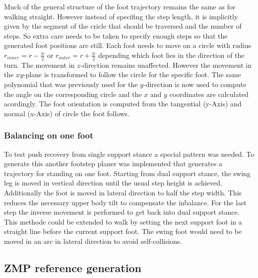 \documentclass[english,ngerman]{KITreprt}
\newcommand{\clr}[2]{{\color{#1}{#2}}}
\newcommand{\todo}[1]{\marginpar{\clr{red}{#1}}}
\begin{document}
Much of the general structure of the foot trajectory remains the same as
for walking straight. However instead of specifing the step length, it
is implicitly given by the segment of the cricle that should be
traversed and the number of steps. So extra care needs to be taken to
specify enough steps so that the generated foot positions are still.
Each foot needs to move on a circle with radius
$r_{inner} = r - \frac{w}{2}$ or $r_{outer} = r + \frac{w}{2}$ depending
which foot lies in the direction of the turn. The movement in
$z$-direction remains unaffected. However the movement in the $xy$-plane
is transformed to follow the circle for the specific foot.
\todo{Current implementation does effectively that, but is actually a hack. Needs seperate trajectories for left/right}
The same polynomial that was previously used for the $y$-direction is
now used to compute the angle on the corresponding circle and the $x$
and $y$ coordinates are calculated acordingly. The foot orientation is
computed from the tangential (y-Axis) and normal (x-Axis) of circle the
foot follows.

\subsubsection{Balancing on one foot}\label{balancing-on-one-foot}

To test push recovery from single support stance a special pattern was
needed. To generate this another footstep planer was implemented that
generates a trajectory for standing on one foot. Starting from dual
support stance, the swing leg is moved in vertical direction until the
usual step height is achieved. Additionally the foot is moved in lateral
direction to half the step width. This reduces the necessary upper body
tilt to compensate the inbalance. For the last step the inverse movement
is performed to get back into dual support stance. This methode could be
extended to walk by setting the next support foot in a straight line
before the current support foot. The swing foot would need to be moved
in an arc in lateral direction to avoid self-collisions.
\todo{It is easy to extent this: DO IT.}

\subsection{ZMP reference generation}\label{zmp-reference-generation}
\end{document}
